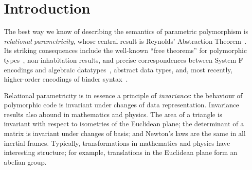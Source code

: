 \section{Introduction}
\label{sec:introduction}
The best way we know of describing the semantics of parametric
polymorphism is \emph{relational parametricity}, whose central result
is Reynolds' Abstraction Theorem~\cite{reynolds83types}. Its striking
consequences include the well-known ``free theorems'' for polymorphic
types~\cite{wadler89theorems}, non-inhabitation results, and precise
correspondences between System F encodings and algebraic
datatypes~\cite{PittsAM:parpoe}, abstract data types, and, most
recently, higher-order encodings of binder
syntax~\cite{syntaxforfree}.

Relational parametricity is in essence a principle of
\emph{invariance}: the behaviour of polymorphic code is invariant
under changes of data representation. Invariance results also abound in
mathematics and physics. The area of a triangle is invariant with
respect to isometries of the Euclidean plane; the determinant of a
matrix is invariant under changes of basis; and Newton's laws are the
same in all inertial frames. Typically, transformations in mathematics
and physics have interesting structure; for example, translations in
the Euclidean plane form an abelian group.




